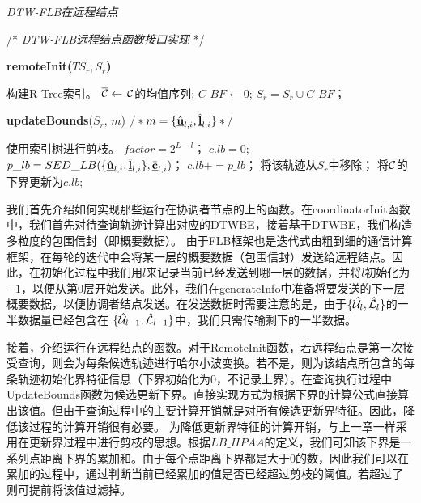 \begin{algorithm}[t]
	\renewcommand{\baselinestretch}{1}
	\caption{{\sl DTW-FLB在远程结点} \label{alg:DTWRemote}}
	\begin{algorithmic}[2]
		\STATE /* \emph{DTW-FLB远程结点函数接口实现} */
	\end{algorithmic}
	\textbf{remoteInit($TS_{r} , S_{r}$)}
	\begin{algorithmic}[1]
			\STATE 构建R-Tree索引。
				\STATE $\overline{\cal C} \leftarrow$  $\cal C$的均值序列; 
			\ENDFOR 
		\ENDIF
		\STATE $C\_BF \leftarrow 0$;  
		\STATE $S_{r}=S_{r} \cup C\_BF$；
		\ENDFOR
	\end{algorithmic}
	\textbf{updateBounds}($S_{r}$, $m$) \qquad  $/*m=\{ \hat{\emph{{\textbf{u}}}}_{l,i}, \hat{\emph{{\textbf{l}}}}_{l,i} \}*/$
	\begin{algorithmic}[1]
			\STATE 使用索引树进行剪枝。
		\ENDIF
			\STATE $factor =2^{L-l}$；
			\STATE $c.lb=0$;
					\STATE $p\_lb=SED\_LB(\{ \hat{\emph{{\textbf{u}}}}_{l,i}, \hat{\emph{{\textbf{l}}}}_{l,i} \}, \bar{\emph{{\textbf{c}}}}_{l,i})$；
					\STATE $c.lb+=p\_lb$；
						\STATE 将该轨迹从$S_{r}$中移除；
					\ENDIF
			\ENDFOR 
			\STATE 将$\cal C$的下界更新为$c.lb$;
		\ENDFOR
	\end{algorithmic}
\end{algorithm}
我们首先介绍如何实现那些运行在协调者节点的上的函数。在\textsf{coordinatorInit}函数中，我们首先对待查询轨迹计算出对应的DTWBE，接着基于DTWBE，我们构造多粒度的包围信封（即概要数据）。
由于FLB框架也是迭代式由粗到细的通信计算框架，在每轮的迭代中会将某一层的概要数据（包围信封）发送给远程结点。因此，在初始化过程中我们用$l$来记录当前已经发送到哪一层的数据，并将$l$初始化为$-1$，以便从第0层开始发送。此外，我们在\textsf{generateInfo}中准备将要发送的下一层概要数据，以便协调者结点发送。在发送数据时需要注意的是，由于$ \{\hat{{\cal U}_{l}}, \hat{{\cal L}_{l}}\}$的一半数据量已经包含在 $\{\hat{{\cal U}}_{l-1}, \hat{{\cal L}}_{l-1}\}$中，我们只需传输剩下的一半数据。


接着，介绍运行在远程结点的函数。对于\textsf{RemoteInit}函数，若远程结点是第一次接受查询，则会为每条候选轨迹进行哈尔小波变换。若不是，则为该结点所包含的每条轨迹初始化界特征信息（下界初始化为0，不记录上界）。在查询执行过程中\textsf{UpdateBounds}函数为候选更新下界。直接实现方式为根据下界的计算公式直接算出该值。但由于查询过程中的主要计算开销就是对所有候选更新界特征。因此，降低该过程的计算开销很有必要。
为降低更新界特征的计算开销，与上一章一样采用在更新界过程中进行剪枝的思想。根据$LB\_HPAA$的定义，我们可知该下界是一系列点距离下界的累加和。由于每个点距离下界都是大于0的数，因此我们可以在累加的过程中，通过判断当前已经累加的值是否已经超过剪枝的阈值。若超过了 则可提前将该值过滤掉。

